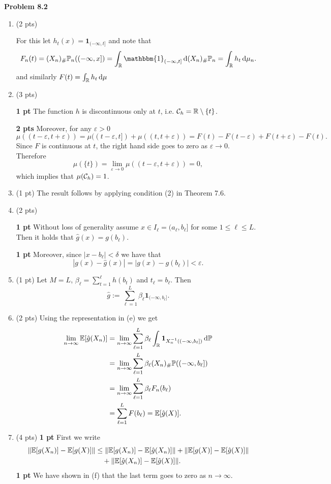 
\textbf{Problem 8.2}

\begin{enumerate}[label={(\alph*)}]
\item (2 pts) 

For this let $h_t(x) = \mathbf{1}_{(-\infty,t]}$ and note that 
\[
	F_n(t) = (X_n)_\# \bbP_n ((-\infty,x]) = \int_\bbR \mathbbm{1}_{(-\infty,t]} \, \dd (X_n)_\# \bbP_n
	= \int_\bbR h_t \, \dd \mu_n.
\]
and similarly $F(t) = \int_{\mathbb R} h_t \, \mathrm{d} \mu$
\item (3 pts)

\textbf{1 pt} The function $h$ is discontinuous only at $t$, i.e. $\mathcal C_h = \mathbb R \setminus \{t\}$. 

\textbf{2 pts} Moreover, for any $\varepsilon > 0$
\[
	\mu((t-\varepsilon, t+\varepsilon)) = \mu((t-\varepsilon,t]) + \mu((t,t+\varepsilon))
	= F(t) - F(t-\varepsilon) + F(t + \varepsilon) - F(t).
\]
Since $F$ is continuous at $t$, the right hand side goes to zero as $\varepsilon \to 0$. Therefore
\[
	\mu(\{t\}) = \lim_{\varepsilon \to 0} \mu((t-\varepsilon, t+\varepsilon)) = 0,
\]
which implies that $\mu(\mathcal C_h) = 1$.
\item (1 pt) The result follows by applying condition (2) in Theorem 7.6.
\item (2 pts)

\textbf{1 pt} Without loss of generality assume $x \in I_\ell = (a_\ell, b_\ell]$ for some $1 \le \ell \le L$. Then it holds that $\hat{g}(x) = g(b_\ell)$. 

\textbf{1 pt} Moreover, since $|x - b_\ell| < \delta$ we have that
\[
	|g(x) - \hat{g}(x)| = |g(x) - g(b_\ell)| < \varepsilon.
\]
\item (1 pt) Let $M=L$, $\beta_\ell = \sum_{t = 1}^\ell h(b_t)$ and $t_\ell = b_\ell$. Then
\[
	\hat{g} := \sum_{\ell = 1}^L \beta_\ell \mathbf{1}_{(-\infty, b_\ell]}.
\]
\item (2 pts) Using the representation in (e) we get
\begin{align*}
	\lim_{n \to \infty} \mathbb E[\hat{g}(X_n)] 
	&= \lim_{n \to \infty} \sum_{\ell = 1}^L \beta_\ell \int_{\mathbb R} \mathbf{1}_{X_n^{-1}((-\infty,b_\ell])} \, \mathrm{d} \mathbb P \\
	&= \lim_{n \to \infty} 	\sum_{\ell = 1}^L \beta_\ell (X_n)_\# \mathbb P ((-\infty, b_\ell]) \\
	&= \lim_{n \to \infty} 	\sum_{\ell = 1}^L \beta_\ell F_n(b_\ell) \\
	&= \sum_{\ell = 1}^L F(b_\ell) = \mathbb E[\hat{g}(X)].
\end{align*}
\item (4 pts)
\textbf{1 pt} First we write
\begin{align*}
	\|\mathbb E[g(X_n)] - \mathbb E[g(X)]\| &\le \|\mathbb E[g(X_n)] - \mathbb E[\hat{g}(X_n)]\| 
		+ \|\mathbb E[g(X)] - \mathbb E[\hat{g}(X)]\| \\
	&\hspace{10pt}+ \|\mathbb E[\hat{g}(X_n)] - \mathbb E[\hat{g}(X)]\|.
\end{align*}
\textbf{1 pt} We have shown in (f) that the last term goes to zero as $n \to \infty$. 


\end{enumerate}
